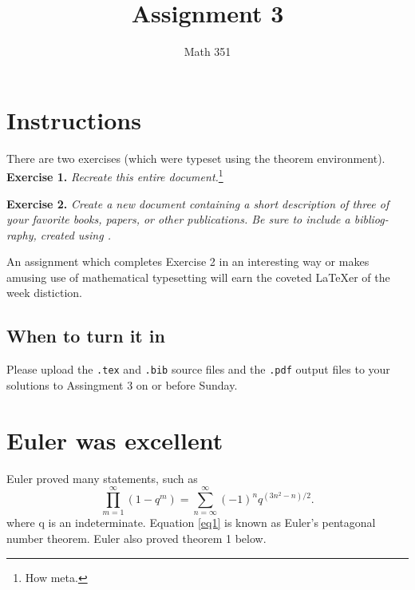 \documentclass{article}
\title{Assignment 3}
\author{Math 351}
\date{}
\begin{document}
\maketitle

\tableofcontents
\section{Instructions}

There are two exercises (which were typeset using the theorem environment).
\noindent\textbf{Exercise 1.} \emph{Recreate this entire document.}\footnote{How meta.}

\noindent\textbf{Exercise 2.} \emph{Create a new document containing a short description
of three of your favorite books, papers, or other publications. Be sure to include
a bibliog-raphy, created using .}

An assignment which completes Exercise 2 in an interesting way or makes amusing
use of mathematical typesetting will earn the coveted \LaTeX er of the week distiction.

\subsection[Due Date]{When to turn it in}

Please upload the \verb~.tex~ and \verb~.bib~ source files and the \verb~.pdf~ output files
to your solutions to Assingment 3 on or before Sunday.

\section{Euler was excellent}

Euler proved many statements, such as
\begin{equation}
    \prod_{m=1}^{\infty} \left(1-q^m\right) = \sum_{n=\infty}^{\infty} \left(-1\right)^n q^{\left(3n^2-n\right)/2}. \label{eq1}
\end{equation}
where q is an indeterminate. Equation \eqref{eq1} is known as Euler's pentagonal number
theorem. Euler also proved theorem 1 below.
\end{document}
